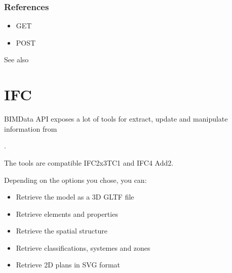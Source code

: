 \documentclass[a4paper,12pt,english]{sphinxmanual}
\begin{document}
\subsubsection{References}
\label{\detokenize{concepts/folders_and_documents:id1}}\begin{itemize}
\item {} 
GET 

\item {} 
POST 

\end{itemize}




See also {\hyperref[\detokenize{tutorials/guided_tour:api-onboarding-cloud}]{}}



\ignorespaces 

\section{IFC}
\label{\detokenize{concepts/ifc:ifc}}\label{\detokenize{concepts/ifc:index-0}}\label{\detokenize{concepts/ifc::doc}}
BIMData API exposes a lot of tools for extract, update and manipulate information from %
\begin{footnote}[2]\sphinxAtStartFootnote
{}
%
\end{footnote}.

The tools are compatible IFC2x3TC1 and IFC4 Add2.

Depending on the options you chose, you can:
\begin{itemize}
\item {} 
Retrieve the model as a 3D GLTF file

\item {} 
Retrieve elements and properties

\item {} 
Retrieve the spatial structure

\item {} 
Retrieve classifications, systemes and zones

\item {} 
Retrieve 2D plans in SVG format

\end{itemize}
\end{document}
